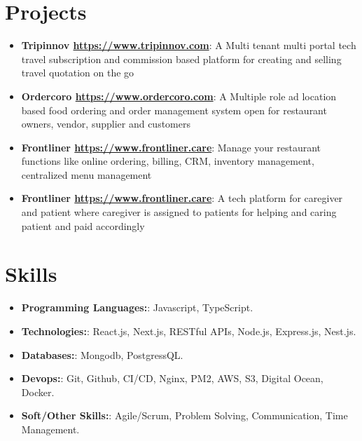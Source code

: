 \documentclass[letterpaper,11pt]{article}
\newcommand{\resumeItem}[2]{
  \item\small{
    \textbf{#1}{: #2 \vspace{-2pt}}
  }
}
\newcommand{\resumeSubItem}[2]{\resumeItem{#1}{#2}\vspace{-4pt}}
\newcommand{\resumeSubHeadingListStart}{\begin{itemize}[leftmargin=*]}
\newcommand{\resumeSubHeadingListEnd}{\end{itemize}}
\begin{document}
\section{Projects}
  \resumeSubHeadingListStart
    \resumeSubItem{Tripinnov \href{https://tripinnov.com/}{https://www.tripinnov.com}}
      {A Multi tenant multi portal tech travel subscription and commission based platform for creating and selling travel quotation on the go}
    \resumeSubItem{Ordercoro \href{https://ordercoro.com/}{https://www.ordercoro.com}}
      {A Multiple role ad location based food ordering and order management system open for restaurant owners, vendor, supplier and customers }
    \resumeSubItem{Frontliner \href{https://frontliner.care/}{https://www.frontliner.care}}
      {Manage your restaurant functions like online ordering, billing, CRM, inventory management, centralized menu management}
    \resumeSubItem{Frontliner \href{https://frontliner.care/}{https://www.frontliner.care}}
      {A tech platform for caregiver and patient where caregiver is assigned to patients for helping and caring patient and paid accordingly}
  \resumeSubHeadingListEnd

%
\section{Skills}
 \resumeSubHeadingListStart
    \resumeSubItem{Programming Languages:} {Javascript, TypeScript.}
    \resumeSubItem{Technologies:} {React.js, Next.js, RESTful APIs, Node.js, Express.js, Nest.js.}
    \resumeSubItem{Databases:} {Mongodb, PostgressQL.}
    \resumeSubItem{Devops:} {Git, Github, CI/CD, Nginx, PM2, AWS, S3, Digital Ocean, Docker.}
    \resumeSubItem{Soft/Other Skills:} {Agile/Scrum, Problem Solving, Communication, Time Management.}
 \resumeSubHeadingListEnd

\end{document}
